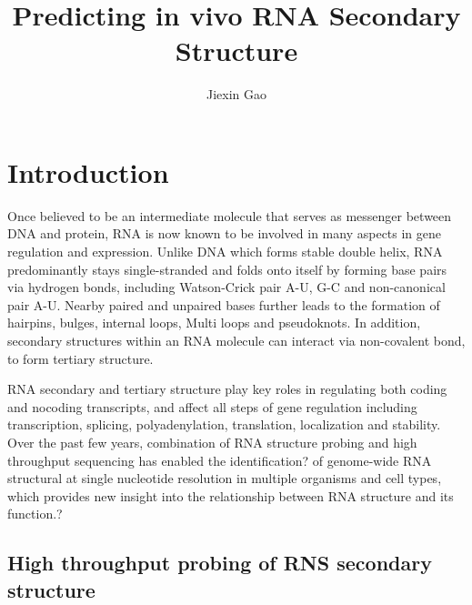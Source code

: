 \documentclass{proposal}
\author{Jiexin Gao}
\title{Predicting in vivo RNA Secondary Structure}
\begin{document}
\begin{preliminary}

\maketitle

\begin{abstract}



\end{abstract}

\tableofcontents

\end{preliminary}





\chapter{Introduction}




Once believed to be an intermediate molecule that serves as messenger between DNA and protein,
RNA is now known to be involved in many aspects in gene regulation and expression.
Unlike DNA which forms stable double helix, RNA predominantly stays single-stranded and folds onto itself by
forming base pairs via hydrogen bonds, including Watson-Crick pair A-U, G-C and non-canonical pair A-U.
Nearby paired and unpaired bases  further leads to the formation of
hairpins, bulges, internal loops, Multi loops and pseudoknots.
In addition, secondary structures within an RNA molecule can interact via non-covalent bond, to form tertiary structure.


RNA secondary and tertiary structure play key roles in regulating both coding and nocoding transcripts,
and affect all steps of gene regulation including transcription, splicing, polyadenylation, translation,
localization and stability\cite{wan2011understanding, mortimer2014insights, bevilacqua2016genome}.
Over the past few years, combination of RNA structure probing and high throughput sequencing has enabled
the identification? of genome-wide RNA structural at single nucleotide resolution in multiple organisms and cell types,
which provides new insight into the relationship between RNA structure and its function.?

\section{High throughput probing of RNS secondary structure}
\end{document}

